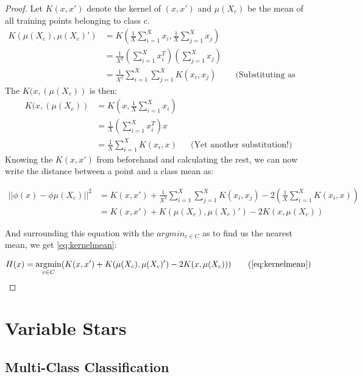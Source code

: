 \documentclass{article}
\DeclareMathOperator*{\argmin}{\arg\!\min}
\theoremstyle{plain}
\theoremstyle{nonumberplain}
\newtheorem{proof}{Proof}
\begin{document}
\begin{proof}
Let $K(x,x')$ denote the kernel of $(x,x')$ and $\mu(X_c)$ be the mean of all training points belonging to class c.
\begin{align*}
	K(\mu(X_c),\mu(X_c)') &= K(\frac{1}{X}\sum_{i=1}^{X}x_i,\frac{1}{X}\sum_{j=1}^{X}x_j) \\
	&= \frac{1}{X^2}(\sum_{i=1}^{X}x_i^T)(\sum_{j=1}^{X}x_j) \\
	&= \frac{1}{X^2} \sum_{i=1}^{X} \sum_{j=1}^{X} K(x_i,x_j) && \text{(Substituting as above)}
\end{align*}
The $K(x,(\mu(X_c))$ is then:
\begin{align*}
	K(x,(\mu(X_c))
	&= K(x,\frac{1}{X}\sum_{i=1}^{X}x_i) \\
	&= \frac{1}{X}(\sum_{i=1}^Xx_i^T)x \\
	&= \frac{1}{X} \sum_{i=1}^X K(x_i,x) && \text{(Yet another substitution!)}
\end{align*}
Knowing the $K(x,x')$ from beforehand and calculating the rest, we can now write the distance between a point and a class mean as:

\begin{align*}
	|| \phi(x) - \phi{ \mu(X_c) } || ^2
		 &=  K(x,x') + \frac{1}{X^2} \sum_{i=1}^{X} \sum_{j=1}^{X} K(x_i,x_j)  -  2 (\frac{1}{X} \sum_{i=1}^X K(x_i,x)) \\
		 &= K(x,x')+K(\mu(X_c),\mu(X_c)')-2K(x,\mu(X_c))
\end{align*}

And surrounding this equation with the $argmin_{c \in C}$ as to find us the nearest mean, we get \eqref{eq:kernelmean}:

\begin{align*}
	H(x) = \argmin_{c \in C}(K(x,x')+K(\mu(X_c),\mu(X_c)')-2K(x,\mu(X_c)) ) \tag{\ref{eq:kernelmean}}
\end{align*}

\end{proof}

\section{Variable Stars}

\subsection{Multi-Class Classification}
\end{document}
